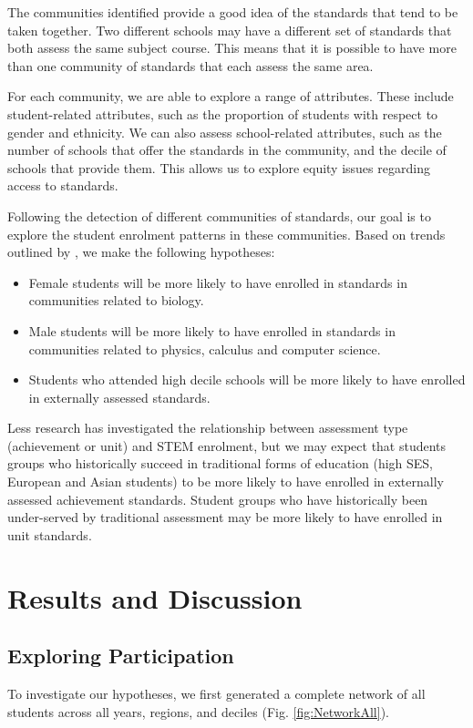 The communities identified provide a good idea of the standards that tend to be taken together. Two different schools may have a different set of standards that both assess the same subject course. This means that it is possible to have more than one community of standards that each assess the same area.

For each community, we are able to explore a range of attributes. These include student-related attributes, such as the proportion of students with respect to gender and ethnicity. We can also assess school-related attributes, such as the number of schools that offer the standards in the community, and the decile of schools that provide them. This allows us to explore equity issues regarding access to standards. 

Following the detection of different communities of standards, our goal is to explore the student enrolment patterns in these communities. Based on trends outlined by \citet{EducationCounts_2018}, we make the following hypotheses:
\begin{itemize}
    \item Female students will be more likely to have enrolled in standards in communities related to biology.
    \item Male students will be more likely to have enrolled in standards in communities related to physics, calculus and computer science.
    \item Students who attended high decile schools will be more likely to have enrolled in externally assessed standards.
\end{itemize}
Less research has investigated the relationship between assessment type (achievement or unit) and STEM enrolment, but we may expect that students groups who historically succeed in traditional forms of education (high SES, European and Asian students) to be more likely to have enrolled in externally assessed achievement standards. Student groups who have historically been under-served by traditional assessment may be more likely to have enrolled in unit standards. 




\section{Results and Discussion}
\subsection{Exploring Participation}
To investigate our hypotheses, we first generated a complete network of all students across all years, regions, and deciles (Fig. \ref{fig:NetworkAll}).

